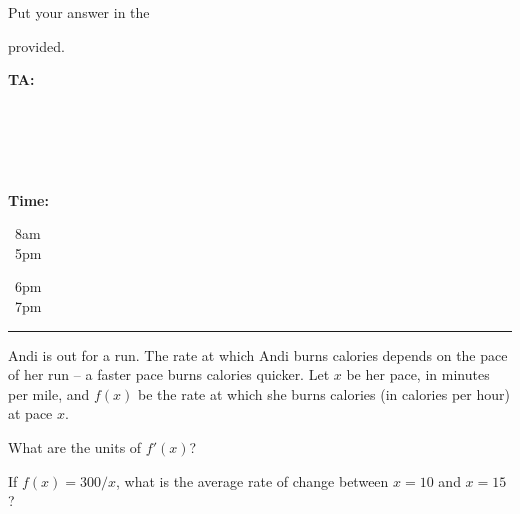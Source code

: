 \documentclass[12pt]{article}
\begin{document}
\begin{minipage}{0.45\linewidth}
  Put your answer in the 
  provided.
\end{minipage}
\hfill
\begin{minipage}{0.5\linewidth}
  \textbf{TA:}\ 
  \parbox[t]{0.85in}{%
    \checkbox\ \TAThree \\
    \checkbox\ \TAOne %
  }
  \parbox[t]{0.85in}{%
    \checkbox\ \TATwo
  }
  \textbf{Time:}
  \parbox[t]{0.55in}{%
    \checkbox\ 8am \\
    \checkbox\ 5pm
  }
  \quad
  \parbox[t]{0.55in}{%
    \checkbox\ 6pm \\
    \checkbox\ 7pm 
  }
\end{minipage}
\noindent\hspace*{-2em}\rule{\textwidth+4em}{1pt}%

\begin{enumerate}
  \setcounter{problemnumber}{0}
  \Problem %
  Andi is out for a run.  The rate at which Andi burns calories
  depends on the pace of her run -- a faster pace burns calories
  quicker.  Let $x$ be her pace, in minutes per mile, and $f(x)$ be the
  rate at which she burns calories (in calories per hour) at pace $x$.  
  \begin{enumerate}
    \Part What are the units of $f'(x)$?
    \hfill
    \vfill

    \Part If $f(x) = 300/x$, what is the average rate of change
    between $x=10$ and $x=15$?
    \hfill
    \vfill


  \end{enumerate}


\end{enumerate}
\end{document}
